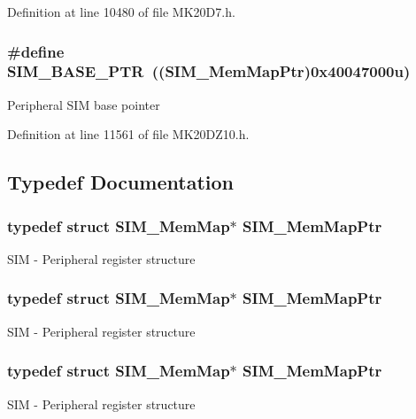 Definition at line 10480 of file M\+K20\+D7.\+h.

\subsubsection[{\texorpdfstring{S\+I\+M\+\_\+\+B\+A\+S\+E\+\_\+\+P\+TR}{SIM_BASE_PTR}}]{\setlength{\rightskip}{0pt plus 5cm}\#define S\+I\+M\+\_\+\+B\+A\+S\+E\+\_\+\+P\+TR~(({\bf S\+I\+M\+\_\+\+Mem\+Map\+Ptr})0x40047000u)}\hypertarget{group___s_i_m___peripheral_ga719ec5df95fbb5732438f794f2cccf3c}{}\label{group___s_i_m___peripheral_ga719ec5df95fbb5732438f794f2cccf3c}
Peripheral S\+IM base pointer 

Definition at line 11561 of file M\+K20\+D\+Z10.\+h.



\subsection{Typedef Documentation}
\subsubsection[{\texorpdfstring{S\+I\+M\+\_\+\+Mem\+Map\+Ptr}{SIM_MemMapPtr}}]{\setlength{\rightskip}{0pt plus 5cm}typedef struct {\bf S\+I\+M\+\_\+\+Mem\+Map}$\ast$ {\bf S\+I\+M\+\_\+\+Mem\+Map\+Ptr}}\hypertarget{group___s_i_m___peripheral_ga708a122e8ca55082e0cf67cab6a77d02}{}\label{group___s_i_m___peripheral_ga708a122e8ca55082e0cf67cab6a77d02}
S\+IM -\/ Peripheral register structure 
\subsubsection[{\texorpdfstring{S\+I\+M\+\_\+\+Mem\+Map\+Ptr}{SIM_MemMapPtr}}]{\setlength{\rightskip}{0pt plus 5cm}typedef struct {\bf S\+I\+M\+\_\+\+Mem\+Map}$\ast$ {\bf S\+I\+M\+\_\+\+Mem\+Map\+Ptr}}\hypertarget{group___s_i_m___peripheral_ga708a122e8ca55082e0cf67cab6a77d02}{}\label{group___s_i_m___peripheral_ga708a122e8ca55082e0cf67cab6a77d02}
S\+IM -\/ Peripheral register structure 
\subsubsection[{\texorpdfstring{S\+I\+M\+\_\+\+Mem\+Map\+Ptr}{SIM_MemMapPtr}}]{\setlength{\rightskip}{0pt plus 5cm}typedef struct {\bf S\+I\+M\+\_\+\+Mem\+Map}$\ast$ {\bf S\+I\+M\+\_\+\+Mem\+Map\+Ptr}}\hypertarget{group___s_i_m___peripheral_ga708a122e8ca55082e0cf67cab6a77d02}{}\label{group___s_i_m___peripheral_ga708a122e8ca55082e0cf67cab6a77d02}
S\+IM -\/ Peripheral register structure 